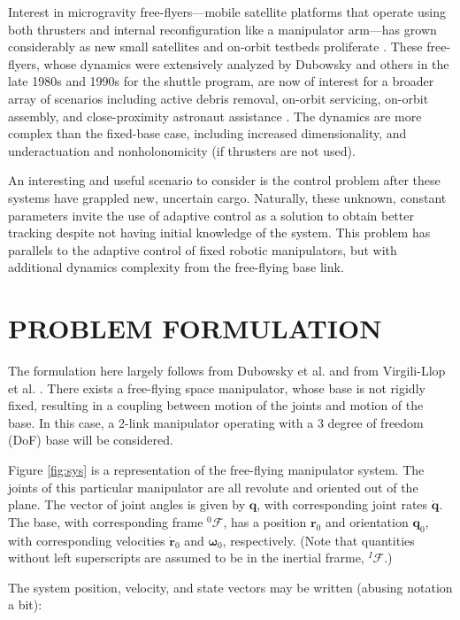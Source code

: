 \documentclass[letterpaper, 10 pt, conference]{ieeeconf}  %
\begin{document}
Interest in microgravity free-flyers---mobile satellite platforms that operate using both thrusters and internal reconfiguration like a manipulator arm---has grown considerably as new small satellites and on-orbit testbeds proliferate \cite{Smith2016} \cite{Saenz-Otero2005a}. These free-flyers, whose dynamics were extensively analyzed by Dubowsky and others in the late 1980s and 1990s for the shuttle program, are now of interest for a broader array of scenarios including active debris removal, on-orbit servicing, on-orbit assembly, and close-proximity astronaut assistance \cite{Dubowsky1993} \cite{Yoshida2001}. The dynamics are more complex than the fixed-base case, including increased dimensionality, and underactuation and nonholonomicity (if thrusters are not used).

An interesting and useful scenario to consider is the control problem after these systems have grappled new, uncertain cargo. Naturally, these unknown, constant parameters invite the use of adaptive control as a solution to obtain better tracking despite not having initial knowledge of the system. This problem has parallels to the adaptive control of fixed robotic manipulators, but with additional dynamics complexity from the free-flying base link. 

\section{PROBLEM FORMULATION}

The formulation here largely follows from Dubowsky et al. and from Virgili-Llop et al. \cite{Dubowsky1993} \cite{Virgili-Llop}. There exists a free-flying space manipulator, whose base is not rigidly fixed, resulting in a coupling between motion of the joints and motion of the base. In this case, a 2-link manipulator operating with a 3 degree of freedom (DoF) base will be considered.

Figure \ref{fig:sys} is a representation of the free-flying manipulator system. The joints of this particular manipulator are all revolute and oriented out of the plane. The vector of joint angles is given by $\mathbf{q}$, with corresponding joint rates $\dot{\mathbf{q}}$. The base, with corresponding frame $^0\mathcal{F}$, has a position $\mathbf{r}_0$ and orientation $\mathbf{q}_0$, with corresponding velocities $\dot{\mathbf{r}}_0$ and ${\bm{\omega}}_0$, respectively. (Note that quantities without left superscripts are assumed to be in the inertial frarme, $^I\mathcal{F}$.)

The system position, velocity, and state vectors may be written (abusing notation a bit):
\end{document}
